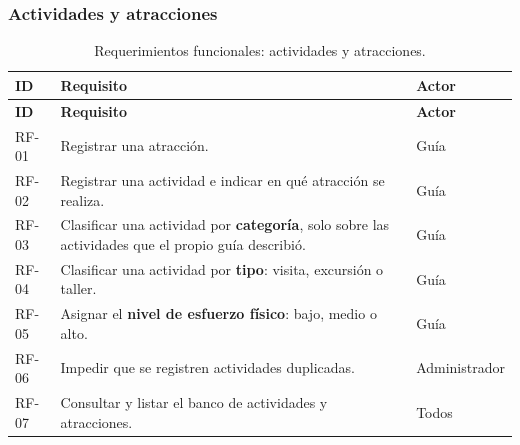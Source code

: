 \documentclass[11pt,a4paper]{article}
\begin{document}
\subsubsection{Actividades y atracciones}
{\footnotesize\setlength{\tabcolsep}{3pt}\renewcommand{\arraystretch}{1.15}
\begin{longtable}{|>{\raggedright\arraybackslash}p{1.28cm}|>{\raggedright\arraybackslash}p{11.28cm}|>{\raggedright\arraybackslash}p{2.98cm}|}
\caption{Requerimientos funcionales: actividades y atracciones.}\label{tab:rf-actividades}\\ \hline
\rowcolor{gray!20} \textbf{ID} & \textbf{Requisito} & \textbf{Actor} \\ \hline
\endfirsthead
\hline \rowcolor{gray!20} \textbf{ID} & \textbf{Requisito} & \textbf{Actor} \\ \hline
\endhead
RF-01 & Registrar una atracción. & Guía \\ \hline
RF-02 & Registrar una actividad e indicar en qué atracción se realiza. & Guía \\ \hline
RF-03 & Clasificar una actividad por \textbf{categoría}, solo sobre las actividades que el propio guía describió. & Guía \\ \hline
RF-04 & Clasificar una actividad por \textbf{tipo}: visita, excursión o taller. & Guía \\ \hline
RF-05 & Asignar el \textbf{nivel de esfuerzo físico}: bajo, medio o alto. & Guía \\ \hline
RF-06 & Impedir que se registren actividades duplicadas. & Administrador \\ \hline
RF-07 & Consultar y listar el banco de actividades y atracciones. & Todos \\ \hline
\end{longtable}}
\vspace{2pt}
\end{document}
